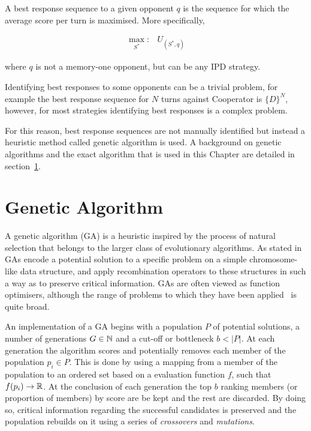 A best response sequence to a given opponent \(q\) is the sequence for which the
average score per turn is maximised. More specifically,

\begin{equation}\label{eq:best_response}
    \begin{aligned}
    \max_{S^*}: & U_{(S^*, q)}
    \end{aligned}
\end{equation}

where \(q\) is not a memory-one opponent, but can be any IPD strategy.

Identifying best responses to some opponents can be a trivial problem, for
example the best response sequence for \(N\) turns against Cooperator is
\(\{D\}^N\), however, for most strategies identifying best responses is a
complex problem.

For this reason, best response sequences are not manually identified but instead
a heuristic method called genetic algorithm is used. A background on genetic
algorithms and the exact algorithm that is used in this Chapter are detailed in
section~\ref{section:genetic_algorithm}.

\section{Genetic Algorithm}\label{section:genetic_algorithm}

A genetic algorithm (GA) is a heuristic inspired by the process of natural
selection that belongs to the larger class of evolutionary algorithms. As stated
in~\cite{Whitley1994} GAs encode a potential solution to a
specific problem on a simple chromosome-like data structure, and apply
recombination operators to these structures in such a way as to preserve
critical information. GAs are often viewed as function
optimisers, although the range of problems to which they have been
applied~\cite{Hou1994, Jones1997, Yang1998} is quite broad.

An implementation of a GA begins with a population \(P\) of
potential solutions, a number of generations \(G \in \mathbb{N}\) and a cut-off or
bottleneck \(b < |P|\). At each generation the algorithm scores and potentially
removes each member of the population \(p_i \in P\). This is done by using a
mapping from a member of the population to an ordered set based on a evaluation
function \(f\), such that \(f(p_i) \to \mathbb{R}\). At the conclusion of each
generation the top \(b\) ranking members (or proportion of members) by score are
be kept and the rest are discarded. By doing so, critical information regarding
the successful candidates is preserved and the population rebuilds on it using a
series of \textit{crossovers} and \textit{mutations}.

